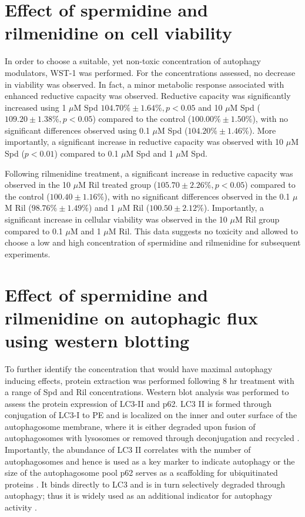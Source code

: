 {\section{Effect of spermidine and rilmenidine on cell viability}
In order to choose a suitable, yet non-toxic concentration of autophagy modulators, WST-1 was performed. For the concentrations assessed, no decrease in viability was observed. In fact, a minor metabolic response associated with enhanced reductive capacity was observed. Reductive capacity was significantly increased using 1 $\mu$M Spd $104.70\% \pm 1.64\%, p < 0.05$ and 10 $\mu$M Spd ($109.20 \pm 1.38\%, p < 0.05$) compared to the control ($100.00\% \pm 1.50\%$), with no significant differences observed using 0.1 $\mu$M Spd ($104.20\% \pm 1.46\%$). More importantly, a significant increase in reductive capacity was observed with 10 $\mu$M Spd ($p < 0.01$) compared to 0.1 $\mu$M Spd and 1 $\mu$M Spd.

Following rilmenidine treatment, a significant increase in reductive capacity was observed in the 10 $\mu$M Ril treated group ($105.70 \pm 2.26\%, p < 0.05$) compared to the control ($100.40 \pm 1.16\%$), with no significant differences observed in the 0.1 $\mu$M Ril ($98.76\% \pm 1.49\%$) and 1 $\mu$M Ril ($100.50 \pm 2.12\%$). Importantly, a significant increase in cellular viability was observed in the 10 $\mu$M Ril group compared to 0.1 $\mu$M and 1 $\mu$M Ril. This data suggests no toxicity and allowed to choose a low and high concentration of spermidine and rilmenidine for subsequent experiments.

\section{Effect of spermidine and rilmenidine on autophagic flux using western blotting}
To further identify the concentration that would have maximal autophagy inducing effects, protein extraction was performed following 8 hr treatment with a range of Spd and Ril concentrations. Western blot analysis was performed to assess the protein expression of LC3-II and p62. LC3 II is formed through conjugation of LC3-I to PE and is localized on the inner and outer surface of the autophagosome membrane, where it is either degraded upon fusion of autophagosomes with lysosomes or removed through deconjugation and recycled \citep{kabeya2000}. Importantly, the abundance of LC3 II correlates with the number of autophagosomes and hence is used as a key marker to indicate autophagy or the size of the autophagosome pool \citep{loos2014} p62 serves as a scaffolding for ubiquitinated proteins \citep{sahani2014}. It binds directly to LC3 and is in turn selectively degraded through autophagy; thus it is widely used as an additional indicator for autophagy activity \citep{pankiv2007}.

}
